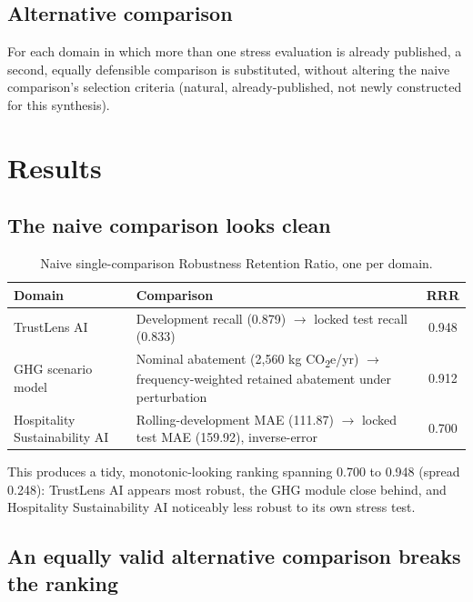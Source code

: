 \documentclass[11pt]{article}
\begin{document}
\subsection{Alternative comparison}

For each domain in which more than one stress evaluation is already published, a second, equally defensible comparison is substituted, without altering the naive comparison's selection criteria (natural, already-published, not newly constructed for this synthesis).

\section{Results}

\subsection{The naive comparison looks clean}

\begin{table}[h]
\centering
\caption{Naive single-comparison Robustness Retention Ratio, one per domain.}
\begin{tabular}{@{}p{5cm}p{6cm}c@{}}
\toprule
\textbf{Domain} & \textbf{Comparison} & \textbf{RRR} \\
\midrule
TrustLens AI & Development recall (0.879) $\to$ locked test recall (0.833) & 0.948 \\
GHG scenario model & Nominal abatement (2{,}560 kg CO\textsubscript{2}e/yr) $\to$ frequency-weighted retained abatement under perturbation & 0.912 \\
Hospitality Sustainability AI & Rolling-development MAE (111.87) $\to$ locked test MAE (159.92), inverse-error & 0.700 \\
\bottomrule
\end{tabular}
\end{table}

This produces a tidy, monotonic-looking ranking spanning 0.700 to 0.948 (spread 0.248): TrustLens AI appears most robust, the GHG module close behind, and Hospitality Sustainability AI noticeably less robust to its own stress test.

\subsection{An equally valid alternative comparison breaks the ranking}
\end{document}
